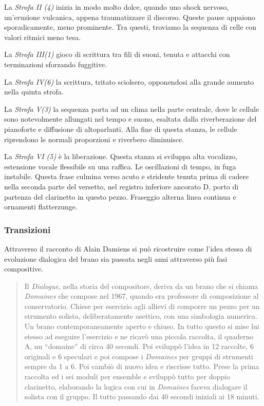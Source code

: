 La \emph{Strofa II (4)} inizia in modo molto dolce, quando uno shock nervoso, un'eruzione vulcanica, appena traumatizzare il discorso. Queste pause appaiono sporadicamente, meno prominente. Tra questi, troviamo la sequenza di celle con valori ritmici meno tesa.

La \emph{Strofa III(1)} gioco di scrittura tra fili di suoni, tenuta e attacchi con terminazioni sforzando fuggitive.

La \emph{Strofa IV(6)} la scrittura, tritato sciolsero, opponendosi alla grande aumento nella quinta strofa.

La \emph{Strofa V(3)} la sequenza porta ad un clima nella parte centrale, dove le cellule sono notevolmente allungati nel tempo e suono, esaltata dalla riverberazione del pianoforte e diffusione di altoparlanti. Alla fine di questa stanza, le cellule riprendono le normali proporzioni e riverbero diminuisce.

La \emph{Strofa VI (5)} è la liberazione. Questa stanza si sviluppa alta vocalizzo, estensione vocale flessibile su una raffica. Le oscillazioni di tempo, in fuga instabile. Questa frase culmina verso acuto e stridente tenuta prima di cadere nella seconda parte del versetto, nel registro inferiore ancorato D, porto di partenza del clarinetto in questo pezzo. Fraseggio alterna linea continua e ornamenti flatterzunge.

\subsubsection*{Transizioni}

Attraverso il racconto di Alain Damiens si può ricostruire come l'idea stessa di evoluzione dialogica del brano sia passata negli anni attraverso più fasi compositive.

\begin{quote}
{\small
Il \emph{Dialogue}, nella storia del compositore, deriva da un brano che si chiama \emph{Domaines} che compose nel 1967, quando era professore di composizione al conservatorio. Chiese per esercizio agli allievi di comporre un pezzo per un strumento solista, deliberatamente asettico, con una simbologia numerica. Un brano contemporaneamente aperto e chiuso. In tutto questo si mise lui stesso ad eseguire l'esercizio e ne ricavò una piccola raccolta, il quaderno A, un “domaine” di circa 40 secondi. Poi sviluppò l'idea in 12 raccolte, 6 originali e 6 speculari e poi compose i \emph{Domaines} per gruppi di strumenti sempre da 1 a 6. Poi cambiò di nuovo idea e riscrisse tutto. Prese la prima raccolta ed i sei moduli per ensemble e sviluppò tutto per doppio clarinetto, elaborando la logica con cui in \emph{Domaines} faceva dialogare il solista con il gruppo. Il tutto passando dai 40 secondi iniziali ai 18 minuti.
}
\end{quote}

